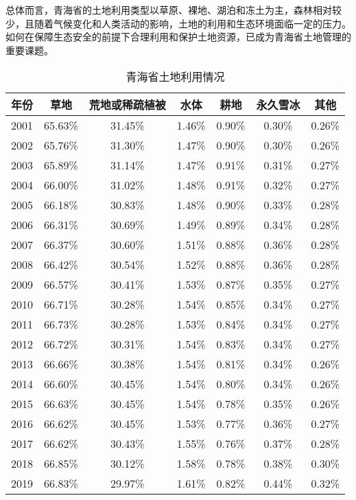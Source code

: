 \documentclass{article}
\begin{document}
		总体而言，青海省的土地利用类型以草原、裸地、湖泊和冻土为主，森林相对较少，且随着气候变化和人类活动的影响，土地的利用和生态环境面临一定的压力。如何在保障生态安全的前提下合理利用和保护土地资源，已成为青海省土地管理的重要课题。
		\begin{table}[H]
			\centering
			\caption{青海省土地利用情况}
			\begin{tabular}{|c|c|c|c|c|c|c|}
				\hline
				年份 & 草地 & 荒地或稀疏植被 & 水体 & 耕地 & 永久雪冰 & 其他 \\
				\hline
				2001 & 65.63\% & 31.45\% & 1.46\% & 0.90\% & 0.30\% & 0.26\% \\
				2002 & 65.76\% & 31.30\% & 1.47\% & 0.90\% & 0.30\% & 0.26\% \\
				2003 & 65.89\% & 31.14\% & 1.47\% & 0.91\% & 0.31\% & 0.27\% \\
				2004 & 66.00\% & 31.02\% & 1.48\% & 0.91\% & 0.32\% & 0.27\% \\
				2005 & 66.18\% & 30.83\% & 1.48\% & 0.90\% & 0.33\% & 0.28\% \\
				2006 & 66.31\% & 30.69\% & 1.49\% & 0.89\% & 0.34\% & 0.28\% \\
				2007 & 66.37\% & 30.60\% & 1.51\% & 0.88\% & 0.36\% & 0.28\% \\
				2008 & 66.42\% & 30.54\% & 1.52\% & 0.88\% & 0.36\% & 0.28\% \\
				2009 & 66.57\% & 30.41\% & 1.53\% & 0.87\% & 0.35\% & 0.27\% \\
				2010 & 66.71\% & 30.28\% & 1.54\% & 0.85\% & 0.34\% & 0.27\% \\
				2011 & 66.73\% & 30.28\% & 1.53\% & 0.84\% & 0.34\% & 0.27\% \\
				2012 & 66.72\% & 30.31\% & 1.54\% & 0.83\% & 0.34\% & 0.27\% \\
				2013 & 66.66\% & 30.38\% & 1.54\% & 0.81\% & 0.34\% & 0.26\% \\
				2014 & 66.60\% & 30.45\% & 1.54\% & 0.80\% & 0.34\% & 0.26\% \\
				2015 & 66.63\% & 30.45\% & 1.54\% & 0.78\% & 0.35\% & 0.26\% \\
				2016 & 66.62\% & 30.45\% & 1.53\% & 0.77\% & 0.36\% & 0.27\% \\
				2017 & 66.62\% & 30.43\% & 1.55\% & 0.76\% & 0.37\% & 0.28\% \\
				2018 & 66.85\% & 30.12\% & 1.58\% & 0.78\% & 0.38\% & 0.30\% \\
				2019 & 66.83\% & 29.97\% & 1.61\% & 0.82\% & 0.44\% & 0.32\% \\
				\hline
			\end{tabular}
		\end{table}
		
\end{document}
